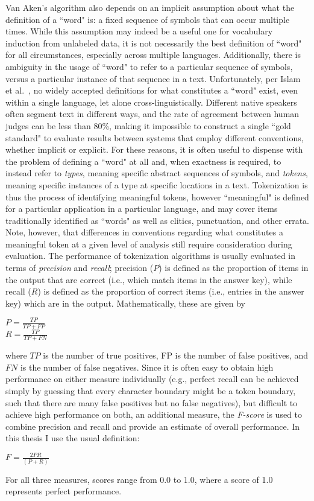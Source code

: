 Van Aken's algorithm also depends on an implicit assumption about what the definition of a ``word" is: a fixed sequence of symbols that can occur multiple times. While this assumption may indeed be a useful one for vocabulary induction from unlabeled data, it is not necessarily the best definition of ``word" for all circumstances, especially across multiple languages. Additionally, there is ambiguity in the usage of ``word" to refer to a particular sequence of symbols, versus a particular instance of that sequence in a text. Unfortunately, per Islam et al.~\cite{islam07}, no widely accepted definitions for what constitutes a ``word" exist, even within a single language, let alone cross-linguistically. Different native speakers often segment text in different ways, and the rate of agreement between human judges can be less than 80\%, making it impossible to construct a single ``gold standard" to evaluate results between systems that employ different conventions, whether implicit or explicit. For these reasons, it is often useful to dispense with the problem of defining a ``word" at all and, when exactness is required, to instead refer to \textit{types}, meaning specific abstract sequences of symbols, and \textit{tokens}, meaning specific instances of a type at specific locations in a text. Tokenization is thus the process of identifying meaningful tokens, however ``meaningful" is defined for a particular application in a particular language, and may cover items traditionally identified as ``words" as well as clitics, punctuation, and other errata. Note, however, that differences in conventions regarding what constitutes a meaningful token at a given level of analysis still require consideration during evaluation. The performance of tokenization algorithms is usually evaluated in terms of \textit{precision} and \textit{recall}; precision ($P$) is defined as the proportion of items in the output that are correct (i.e., which match items in the answer key), while recall ($R$) is defined as the proportion of correct items (i.e., entries in the answer key) which are in the output. Mathematically, these are given by
\begin{center}
	$P = \frac{TP}{TP + FP}$ \\
	$R = \frac{TP}{TP + FN}$
\end{center}
where $TP$ is the number of true positives, FP is the number of false positives, and $FN$ is the number of false negatives. Since it is often easy to obtain high performance on either measure individually (e.g., perfect recall can be achieved simply by guessing that every character boundary might be a token boundary, such that there are many false positives but no false negatives), but difficult to achieve high performance on both, an additional measure, the \textit{F-score} is used to combine precision and recall and provide an estimate of overall performance. In this thesis I use the usual definition:
\begin{center}
	$F = \frac{2PR}{(P + R)}$
\end{center}
For all three measures, scores range from 0.0 to 1.0, where a score of 1.0 represents perfect performance.


